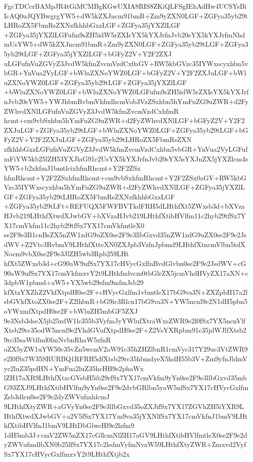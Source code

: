 \documentclass[multi=frame]{standalone}
\begin{document}
    \begin{world}
         FgcTDCcrBAMpJR4tGiMCMBgKGwUXIA8RIS8ZKiQLFSgIEhAdHw4UCSYsBiIcAQ0uJQYBwgrgYW5+dW5kZXJncm91bmR+Zm9yZXN0LGF+ZGFya35yb29tLHRoZX5FbmRsZXNzfkhhbGxzLGF+ZGFya35jYXZlLGF
        +ZGFya35jYXZlLGFufm9sZH5idW5rZXIsYX5kYXJrfnJvb20sYX5kYXJrfmNhdmUsYW5+dW5kZXJncm91bmR+Zm9yZXN0LGF+ZGFya35yb29tLGF+ZGFya35yb29tLGF+ZGFya35jYXZlLGF+bGFyZ2V+Y2F2ZXJ
        uLGFufnVuZGVyZ3JvdW5kfmZvcmVzdCx0aGV+RW5kbGVzc35IYWxscyxhbn5vbGR+YnVua2VyLGF+bWluZXNoYWZ0LGF+bGFyZ2V+Y2F2ZXJuLGF+bWluZXNoYWZ0LGF+ZGFya35yb29tLGF+ZGFya35jYXZlLGF
        +bWluZXNoYWZ0LGF+bWluZXNoYWZ0LGFufm9sZH5idW5rZXIsYX5kYXJrfnJvb20sYW5+YWJhbmRvbmVkfndhcmVob3VzZSxhbn5hYmFuZG9uZWR+d2FyZWhvdXNlLGFufnVuZGVyZ3JvdW5kfmZvcmVzdCxhfmR
        hcmt+cm9vbSxhbn5hYmFuZG9uZWR+d2FyZWhvdXNlLGF+bGFyZ2V+Y2F2ZXJuLGF+ZGFya35yb29tLGF+bWluZXNoYWZ0LGF+ZGFya35yb29tLGF+bGFyZ2V+Y2F2ZXJuLGF+ZGFya35yb29tLHRoZX5FbmRsZXN
        zfkhhbGxzLGFufnVuZGVyZ3JvdW5kfmZvcmVzdCxhbn5vbGR+YnVua2VyLGFufmFiYW5kb25lZH53YXJlaG91c2UsYX5kYXJrfnJvb20sYX5sYXJnZX5jYXZlcm4sYW5+b2xkfmJ1bmtlcixhfmRhcmt+Y2F2ZSx
        hfmRhcmt+Y2F2ZSxhfmRhcmt+cm9vbSxhfmRhcmt+Y2F2ZSx0aGV+RW5kbGVzc35IYWxscyxhbn5hYmFuZG9uZWR+d2FyZWhvdXNlLGF+ZGFya35jYXZlLGF+ZGFya35yb29tLHRoZX5FbmRsZXNzfkhhbGxzLGF
        +ZGFya35yb29tLFt+REFUQX5FWFBVTkdFRH5dLHthfXt5ZWxsb3d+bXVzaHJvb219LHthfXtwdXJwbGV+bXVzaHJvb219LHthfXtibHVlfm11c2hyb29tfSx7YX17cmVkfm11c2hyb29tfSx7YX17cmVkfmtleX0
        se2F9e3B1cnBsZX5nZW1zdG9uZX0se2F9e3llbGxvd35nZW1zdG9uZX0se2F9e2JsdWV+Z2Vtc3RvbmV9LHthfXtteXN0ZXJpb3VzfnJpbmd9LHthfXtncmVlbn5tdXNocm9vbX0se2F9e3JlZH5wb3Rpb259LHt
        hfXt5ZWxsb3d+cG90aW9ufSx7YX17cHVycGxlfnBvdGlvbn0se2F9e2JsdWV+cG90aW9ufSx7YX17cmVkfmxvY2t9LHthfndvcm0tbGlrZX5jcmVhdHVyZX17aXN+c3dpbW1pbmd+aW5+YX5wb29sfm9mfmJsb29
        kfXtzYXZhZ2VkfXtpdH0se2F+cHVycGxlfm1vbmtleX17bG9va3N+ZXZpbH17a2lsbGVkfXtoZX0se2F+Z2lhbnR+bG9ic3Rlcn17bG9va3N+YW5ncnl9e2N1dH5pbn5oYWxmfXtpdH0se2F+bWluZH5mbGF5ZXJ
        9e3Nsb3dseX5jb25zdW1lc355b3VyfmJyYWlufXtraWxsZWR9e2l0fSx7YX5ncnVlfXtsb29rc35odW5ncnl9e2VhdGVufXtpdH0se2F+Z2VsYXRpbm91c35jdWJlfXtsb29rc35saWtlfml0fmNvbnRhaW5zfnR
        oZX5yZW1uYW50c35vZn5wcmV2aW91c35hZHZlbnR1cmVyc317Y29uc3VtZWR9e2l0fSx7W35SRURBQ1RFRH5dfXtsb29rc35hbmdyeX5hdH55b3V+Zm9yfnJldmVyc2luZ35pdHN+YmFua2luZ35hcHB9e2phaWx
        lZH17aXR9LHthfXtzcGVsbH5ib29rfSx7YX17cmVkfm9yYn0se2F9e3llbGxvd35mbG93ZXJ9LHthfXtibHVlfm9yYn0se2F9e2dvbGRlbn5yaW5nfSx7YX17cHVycGxlfmZsb3dlcn0se2F9e2dyZWVufmhlcmJ
        9LHthfXtyZWR+aGVyYn0se2F9e3llbGxvd35oZXJifSx7YX17ZGVhZH5iYXR9LHthfXtwdXJwbGV+a2V5fSx7YX17Ym9va35jYXNlfSx7YX17cmVkfnJ1bmV9LHthfXtibHVlfnJ1bmV9LHtDbGlwcHl9e2lzfm9
        1dH5mb3J+cmV2ZW5nZX17cGllcmNlZH17aGV9LHthfXtibHVlfmtleX0se2F9e2dyZWVufmdlbXN0b25lfSx7YX17c2lsdmVyfmNvaW59LHthfXtyZWR+Zmxvd2VyfSx7YX17cHVycGxlfmxvY2t9LHthfXtjb2x

\end{world}
\end{document}
